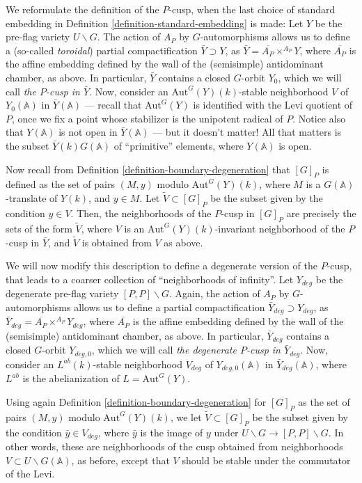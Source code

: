 We reformulate the definition of the $P$-cusp, when the last choice of standard embedding in Definition \ref{definition-standard-embedding} is made: Let $Y$ be the pre-flag variety $U\backslash G$. The action of $A_P$ by $G$-automorphisms allows us to define a (so-called \emph{toroidal}) partial compactification $\bar Y\supset Y$, as $\bar Y = \overline{A_P} \times^{A_P} Y$, where $\overline{A_P}$ is the affine embedding defined by the wall of the (semisimple) antidominant chamber, as above. In particular, $\bar Y$ contains a closed $G$-orbit $Y_0$, which we will call \emph{the $P$-cusp in $\bar Y$}. Now, consider an $\text{Aut}^G(Y)(k)$-stable neighborhood $V$ of $Y_0(\mathbb A)$ in $\bar Y(\mathbb A)$ --- recall that $\text{Aut}^G(Y)$ is identified with the Levi quotient of $P$, once we fix a point whose stabilizer is the unipotent radical of $P$. Notice also that $Y(\mathbb A)$ is not open in $\bar Y(\mathbb A)$ --- but it doesn't matter! All that matters is the subset $\bar Y(k)G(\mathbb A)$ of ``primitive'' elements, where $Y(\mathbb A)$ is open.

Now recall from Definition \ref{definition-boundary-degeneration} that $[G]_P$ is defined as the set of pairs $(M,y)$ modulo $\text{Aut}^G(Y)(k)$, where $M$ is a $G(\mathbb A)$-translate of $Y(k)$, and $y\in M$. Let $\tilde V\subset [G]_P$ be the subset given by the condition $y\in V$. Then, the neighborhoods of the $P$-cusp in $[G]_P$ are precisely the sets of the form $\tilde V$, where $V$ is an $\text{Aut}^G(Y)(k)$-invariant neighborhood of the $P$-cusp in $\bar Y$, and $\tilde V$ is obtained from $V$ as above.



We will now modify this description to define a degenerate version of the $P$-cusp, that leads to a coarser collection of ``neighborhoods of infinity''. Let $Y_{deg}$ be the degenerate pre-flag variety $[P,P]\backslash G$. Again, the action of $A_P$ by $G$-automorphisms allows us to define a partial compactification $\bar Y_{deg}\supset Y_{deg}$, as $\bar Y_{deg} = \overline{A_P} \times^{A_P} Y_{deg}$, where $\overline{A_P}$ is the affine embedding defined by the wall of the (semisimple) antidominant chamber, as above. In particular, $\bar Y_{deg}$ contains a closed $G$-orbit $Y_{deg,0}$, which we will call \emph{the degenerate $P$-cusp in $\bar Y_{deg}$}. Now, consider an $L^{ab}(k)$-stable neighborhood $V_{deg}$ of $Y_{deg,0}(\mathbb A)$ in $\bar Y_{deg}(\mathbb A)$, where $L^{ab}$ is the abelianization of $L=\text{Aut}^G(Y)$.

Using again Definition \ref{definition-boundary-degeneration} for $[G]_P$ as the set of pairs $(M,y)$ modulo $\text{Aut}^G(Y)(k)$, we let $\tilde V\subset [G]_P$ be the subset given by the condition $\bar y\in V_{deg}$, where $\bar y$ is the image of $y$ under $U\backslash G\to [P,P]\backslash G$. In other words, these are neighborhoods of the cusp obtained from neighborhoods $V\subset U\backslash G(\mathbb A)$, as before, except that $V$ should be stable under the commutator of the Levi. 

